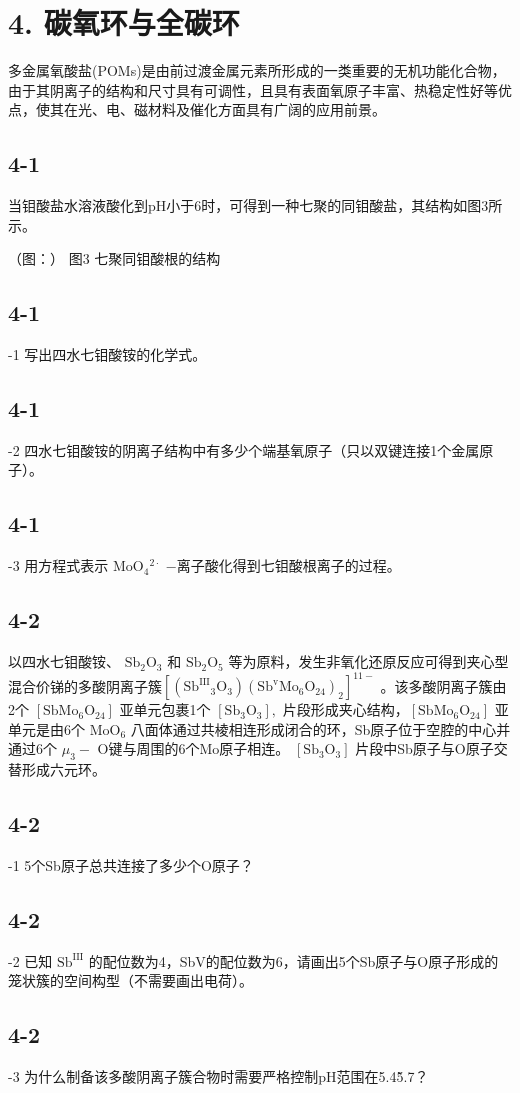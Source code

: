 \section*{4. 碳氧环与全碳环}
多⾦属氧酸盐(POMs)是由前过渡⾦属元素所形成的⼀类重要的⽆机功能化合物，由于其阴离⼦的结构和尺⼨具有可调性，且具有表⾯氧原⼦丰富、热稳定性好等优点，使其在光、电、磁材料及催化⽅⾯具有⼴阔的应⽤前景。

\subsection*{4-1}
当钼酸盐⽔溶液酸化到pH⼩于6时，可得到⼀种七聚的同钼酸盐，其结构如图3所⽰。

（图：）
图3 七聚同钼酸根的结构

\subsection*{4-1}
-1 写出四⽔七钼酸铵的化学式。

\subsection*{4-1}
-2 四⽔七钼酸铵的阴离⼦结构中有多少个端基氧原⼦（只以双键连接1个⾦属原⼦）。

\subsection*{4-1}
-3 ⽤⽅程式表⽰ $\mathrm { M o O } _ { 4 } { } ^ { 2 \cdot }$ −离⼦酸化得到七钼酸根离⼦的过程。

\subsection*{4-2}
以四⽔七钼酸铵、 $\mathrm { S b _ { 2 } O _ { 3 } }$ 和 $\mathrm { S b _ { 2 } O _ { 5 } }$ 等为原料，发⽣⾮氧化还原反应可得到夹⼼型混合价锑的多酸阴离⼦簇$[ ( \mathrm { S b ^ { I I I } { _ 3 } O _ { 3 } } ) ( \mathrm { S b ^ { v } M o _ { 6 } O _ { 2 4 } } ) _ { 2 } ] ^ { \mathrm { 1 1 - } }$ 。该多酸阴离⼦簇由2个 $\left[ \mathrm { S b M o } _ { 6 } \mathrm { O } _ { 2 4 } \right]$ 亚单元包裹1个 $\left[ \mathrm { S b } _ { 3 } \mathrm { O } _ { 3 } \right] ,$ ⽚段形成夹⼼结构，$\left[ \mathrm { S b M o } _ { 6 } \mathrm { O } _ { 2 4 } \right]$ 亚单元是由6个 $\mathrm { M o O } _ { 6 }$ ⼋⾯体通过共棱相连形成闭合的环，Sb原⼦位于空腔的中⼼并通过6个 $\mu _ { 3 } -$ O键与周围的6个Mo原⼦相连。 $\mathrm { [ S b _ { 3 } O _ { 3 } ] }$ ⽚段中Sb原⼦与O原⼦交替形成六元环。

\subsection*{4-2}
-1 5个Sb原⼦总共连接了多少个O原⼦？

\subsection*{4-2}
-2 已知 $\mathrm { S b ^ { I I I } }$ 的配位数为4，SbV的配位数为6，请画出5个Sb原⼦与O原⼦形成的笼状簇的空间构型（不需要画出电荷）。

\subsection*{4-2}
-3 为什么制备该多酸阴离⼦簇合物时需要严格控制pH范围在5.4\~5.7？
